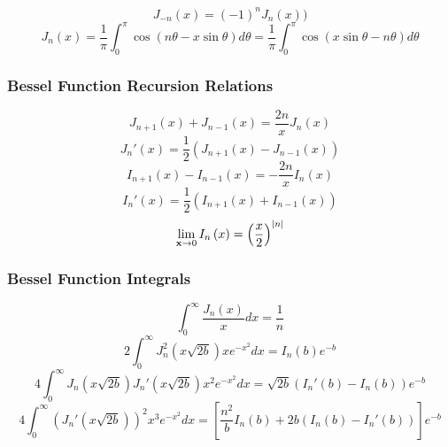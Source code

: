 \begin{equation}
	J_{-n}(x) = (-1)^nJ_n(x))
\end{equation}
\begin{equation}
	J_n(x) = \frac{1}{\pi} \int_0^\pi \cos\left(n\theta - x \sin \theta \right)d\theta = \frac{1}{\pi} \int_0^\pi \cos \left( x \sin \theta - n \theta \right) d\theta
\end{equation}

\subsubsection{Bessel Function Recursion Relations}
\begin{equation}
	J_{n+1}(x) + J_{n-1}(x) = \frac{2n}{x}J_n(x)
\end{equation}
\begin{equation}
	J_n'(x) = \frac{1}{2} \left( J_{n+1}(x) - J_{n-1}(x) \right)
\end{equation}
\begin{equation}
	I_{n+1}(x) - I_{n-1}(x) = -\frac{2n}{x}I_n(x)
\end{equation}
\begin{equation}
	I_n'(x) = \frac{1}{2} \left( I_{n+1}(x) + I_{n-1}(x) \right)
\end{equation}
\begin{equation}
	\lim_{\textbf{x} \to 0} I_n \left( x \right) = \left( \frac{x}{2} \right)^{|n|}
\end{equation}

\subsubsection{Bessel Function Integrals}
\begin{equation}
	\int_0^\infty \frac{J_n (x)}{x} dx = \frac{1}{n}
\end{equation}
\begin{equation}\label{bessel_int_jn2}
	2\int_0^\infty J_n^2 \left( x \sqrt{2b} \right) x e^{-x^2} dx = I_n(b) e^{-b}
\end{equation}
\begin{equation}\label{bessel_int_jn_jn_prime}
	4\int_0^\infty J_n \left( x \sqrt{2b} \right) J_n' \left( x \sqrt{2b} \right) x^2 e^{-x^2} dx = \sqrt{2b} \left(I_n'(b) - I_n(b) \right) e^{-b}
\end{equation}
\begin{equation}\label{bessel_int_jn_prime2}
	4\int_0^\infty \left(J_n' \left( x \sqrt{2b} \right) \right)^2 x^3 e^{-x^2} dx = \left[ \frac{n^2}{b}I_n(b) + 2b \left( I_n(b) - I_n'(b) \right) \right] e^{-b}
\end{equation}

